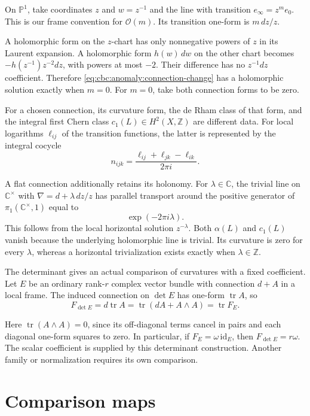 On $\mathbb P^1$, take coordinates $z$ and $w=z^{-1}$ and the line with transition $e_\infty=z^m e_0$.
This is our frame convention for $\mathcal O(m)$.
Its transition one-form is $m\,dz/z$.

A holomorphic form on the $z$-chart has only nonnegative powers of $z$ in its Laurent expansion.
A holomorphic form $h(w)\,dw$ on the other chart becomes $-h(z^{-1})z^{-2}dz$, with powers at most $-2$.
Their difference has no $z^{-1}dz$ coefficient.
Therefore \eqref{eq:cbc:anomaly:connection-change} has a holomorphic solution exactly when $m=0$.
For $m=0$, take both connection forms to be zero.

For a chosen connection, its curvature form, the de Rham class of that form, and the integral first Chern class $c_1(L)\in H^2(X,\mathbb Z)$ are different data.
For local logarithms $\ell_{ij}$ of the transition functions, the latter is represented by the integral cocycle
\[
 n_{ijk}=\frac{\ell_{ij}+\ell_{jk}-\ell_{ik}}{2\pi i}.
\]

A flat connection additionally retains its holonomy.
For $\lambda\in\mathbb C$, the trivial line on $\mathbb C^\times$ with $\nabla=d+\lambda\,dz/z$ has parallel transport around the positive generator of $\pi_1(\mathbb C^\times,1)$ equal to
\[
 \exp(-2\pi i\lambda).
\]
This follows from the local horizontal solution $z^{-\lambda}$.
Both $\alpha(L)$ and $c_1(L)$ vanish because the underlying holomorphic line is trivial.
Its curvature is zero for every $\lambda$, whereas a horizontal trivialization exists exactly when $\lambda\in\mathbb Z$.

The determinant gives an actual comparison of curvatures with a fixed coefficient.
Let $E$ be an ordinary rank-$r$ complex vector bundle with connection $d+A$ in a local frame.
The induced connection on $\det E$ has one-form $\operatorname{tr}A$, so
\begin{equation}\label{eq:cbc:anomaly:determinant}
 F_{\det E}=d\operatorname{tr}A
           =\operatorname{tr}(dA+A\wedge A)
           =\operatorname{tr}F_E.
\end{equation}

Here $\operatorname{tr}(A\wedge A)=0$, since its off-diagonal terms cancel in pairs and each diagonal one-form squares to zero.
In particular, if $F_E=\omega\,\mathrm{id}_E$, then $F_{\det E}=r\omega$.
The scalar coefficient is supplied by this determinant construction.
Another family or normalization requires its own comparison.

\section{Comparison maps}

